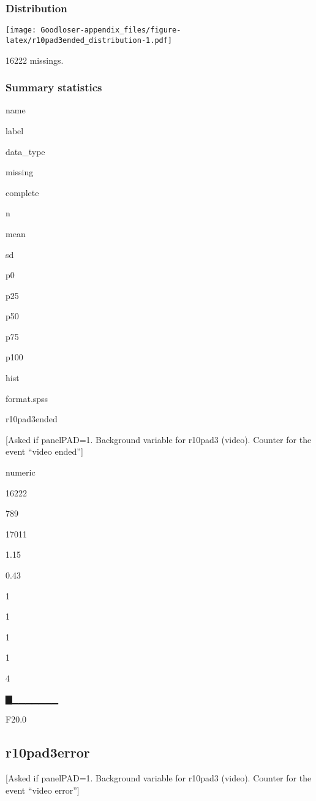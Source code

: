 \documentclass[]{book}
\begin{document}
\subsubsection{Distribution}\label{r10pad3ended_distribution}

\texttt{[image: Goodloser-appendix\_files/figure-latex/r10pad3ended\_distribution-1.pdf]}

16222 missings.

\subsubsection{Summary statistics}\label{r10pad3ended_summary}

name

label

data\_type

missing

complete

n

mean

sd

p0

p25

p50

p75

p100

hist

format.spss

r10pad3ended

{[}Asked if panelPAD=1. Background variable for r10pad3 (video). Counter
for the event ``video ended''{]}

numeric

16222

789

17011

1.15

0.43

1

1

1

1

4

▇▁▁▁▁▁▁▁

F20.0

\subsection{r10pad3error}\label{r10pad3error}

{[}Asked if panelPAD=1. Background variable for r10pad3 (video). Counter
for the event ``video error''{]}
\end{document}
